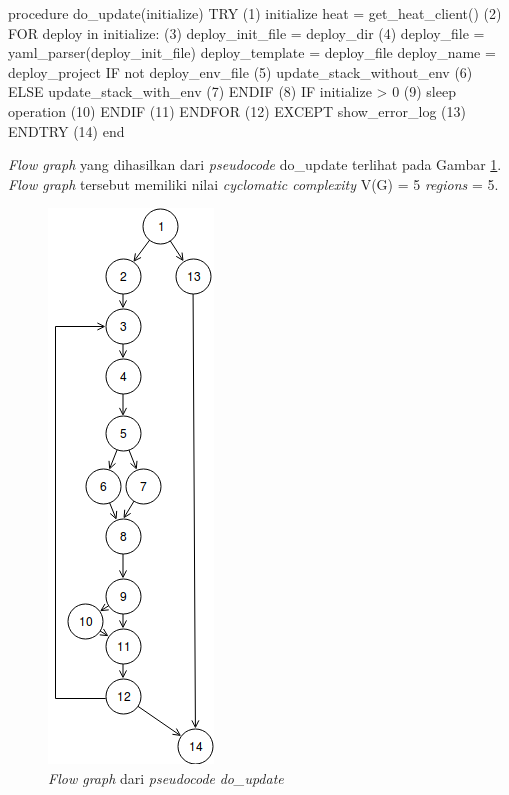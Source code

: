 \begin{code}
\begin{ignasicblock}[title=do\_update,minted language=text]
procedure do_update(initialize)
    TRY                                               (1)
        initialize heat = get_heat_client()           (2)
        FOR deploy in initialize:                     (3)
            deploy_init_file = deploy_dir             (4)
            deploy_file = yaml_parser(deploy_init_file)
            deploy_template = deploy_file
            deploy_name = deploy_project
            IF not deploy_env_file                    (5)
              update_stack_without_env                (6)
            ELSE
              update_stack_with_env                   (7)
            ENDIF                                     (8)
            IF initialize > 0                         (9)
              sleep operation                         (10)
            ENDIF                                     (11)
        ENDFOR                                        (12)
    EXCEPT
       show_error_log                                 (13)
    ENDTRY                                            (14)
end
\end{ignasicblock}
  \label{pc:update}
\end{code}

\par\null\par
\noindent
\emph{Flow graph} yang dihasilkan dari \emph{pseudocode}
do\_update terlihat pada Gambar \ref{cfg:update}.
\emph{Flow graph} tersebut memiliki nilai \emph{cyclomatic complexity} V(G) = 5 \emph{regions} = 5.

\begin{figure}[H]
  \centering
  \includegraphics[width=.18\linewidth]{img/test-case/do_create} %
  \caption{\emph{Flow graph} dari \emph{pseudocode} \emph{do\_update}}
  \label{cfg:update}
\end{figure}

